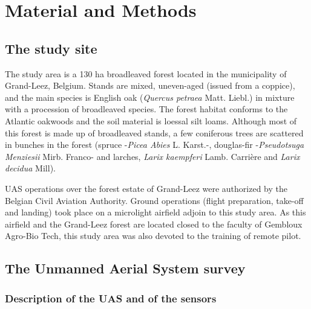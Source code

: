 \documentclass[remotesensing,article,submit,moreauthors,pdftex,12pt,a4paper]{mdpi} %
\begin{document}
\section{Material and Methods}

\subsection{The study site}

The study area is a 130 ha broadleaved forest located in the municipality of Grand-Leez, Belgium. 
Stands are mixed, uneven-aged (issued from a coppice), and the main species is English oak (\textit{Quercus petraea} Matt. Liebl.) in mixture with a procession of broadleaved species. 
The forest habitat conforms to the Atlantic oakwoods and the soil material is loessal silt loams. 
Although most of this forest is made up of broadleaved stands, a few coniferous trees are scattered in bunches in the forest (spruce -\textit{Picea Abies} L. Karst.-, douglas-fir -\textit{Pseudotsuga Menziesii} Mirb. Franco- and larches, \textit{Larix kaempferi} Lamb. Carrière and \textit{Larix decidua} Mill).

UAS operations over the forest estate of Grand-Leez were authorized by the Belgian Civil Aviation Authority. 
Ground operations (flight preparation, take-off and landing) took place on a microlight airfield adjoin to this study area. 
As this airfield and the Grand-Leez forest are located closed to the faculty of Gembloux Agro-Bio Tech, this study area was also devoted to the training of remote pilot. 



\subsection{The Unmanned Aerial System survey}

\subsubsection{Description of the UAS and of the sensors}
\end{document}
